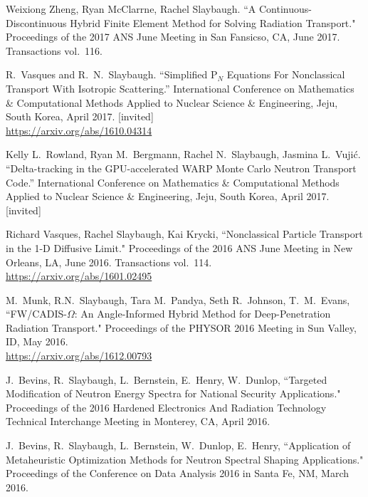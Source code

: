 \begin{bibsection}
\item Weixiong Zheng, Ryan McClarrne, Rachel Slaybaugh. ``A Continuous-Discontinuous Hybrid Finite Element Method for Solving Radiation Transport." Proceedings of the 2017 ANS June Meeting in San Fansicso, CA, June 2017. Transactions vol.\ 116.

\item R.\ Vasques and R.\ N.\ Slaybaugh. ``Simplified P$_N$ Equations For Nonclassical Transport With Isotropic Scattering.'' International Conference on Mathematics \& Computational Methods Applied to Nuclear Science \& Engineering, Jeju, South Korea, April 2017. [invited]\\
\url{https://arxiv.org/abs/1610.04314}

\item Kelly L.\ Rowland, Ryan M.\ Bergmann, Rachel N.\ Slaybaugh, Jasmina L.\ Vuji\'c. ``Delta-tracking in the GPU-accelerated WARP Monte Carlo Neutron Transport Code.'' International Conference on Mathematics \& Computational Methods Applied to Nuclear Science \& Engineering, Jeju, South Korea, April 2017. [invited]

\item Richard Vasques, Rachel Slaybaugh, Kai Krycki, ``Nonclassical Particle Transport in the 1-D Diffusive Limit." Proceedings of the 2016 ANS June Meeting in New Orleans, LA, June 2016. Transactions vol.\ 114.\\
\url{https://arxiv.org/abs/1601.02495}

\item M.\ Munk, R.N.\ Slaybaugh, Tara M.~Pandya, Seth R.~Johnson, T.~M.~Evans, ``FW/CADIS-$\Omega$: An Angle-Informed Hybrid Method for Deep-Penetration Radiation Transport." Proceedings of the PHYSOR 2016 Meeting in Sun Valley, ID, May 2016.\\
\url{https://arxiv.org/abs/1612.00793}

\item J.\ Bevins, R.\ Slaybaugh, L.\ Bernstein, E.\ Henry, W.\ Dunlop, ``Targeted Modification of Neutron Energy Spectra for National Security Applications." Proceedings of the 2016 Hardened Electronics And Radiation Technology Technical Interchange Meeting in Monterey, CA, April 2016. 

\item J.\ Bevins, R.\ Slaybaugh, L.\ Bernstein, W.\ Dunlop, E.\ Henry, ``Application of Metaheuristic Optimization Methods for Neutron Spectral Shaping Applications." Proceedings of the Conference on Data Analysis 2016 in Santa Fe, NM, March 2016. 


\end{bibsection}
